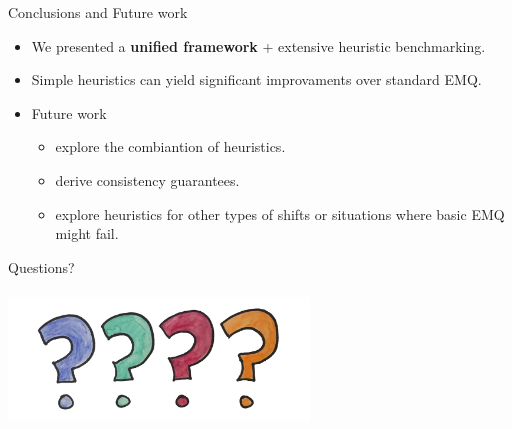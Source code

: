 \documentclass[aspectratio=169]{beamer}
\begin{document}
\begin{frame}{Conclusions and Future work}
  \begin{itemize}
    \item We presented a \textbf{unified framework} + extensive heuristic benchmarking.
    \item Simple heuristics can yield significant improvaments over standard EMQ.
    \item Future work
    \begin{itemize} 
      \item explore the combiantion of heuristics.
      \item derive consistency guarantees.
      \item explore heuristics for other types of shifts or situations where basic EMQ might fail.
    \end{itemize}
  \end{itemize}
\end{frame}

\begin{frame}
  \centering
  \Huge
Questions?\\
\\
\vspace{1cm}
\includegraphics[width=0.6\textwidth]{images/questions.png}
\end{frame}
\end{document}
